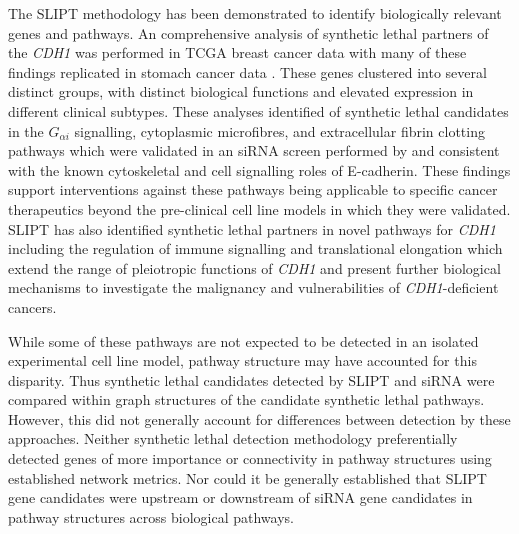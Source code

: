 The \gls{SLIPT} methodology has been demonstrated to identify biologically relevant genes and pathways. An comprehensive analysis of synthetic lethal partners of the \textit{CDH1} was performed in \gls{TCGA} breast cancer data \citep{TCGA2012} with many of these findings replicated in stomach cancer data \citep{TCGA2014GC}. These genes clustered into several distinct groups, with distinct biological functions and elevated expression in different clinical subtypes.  These analyses identified of synthetic lethal candidates in the $G_{\alpha i}$ signalling, cytoplasmic microfibres, and extracellular fibrin clotting pathways which were validated in an \gls{siRNA} screen performed by \citet{Telford2015} and consistent with the known cytoskeletal and cell signalling roles of E-cadherin. These findings support interventions against these pathways being applicable to specific cancer therapeutics beyond the pre-clinical cell line models in which they were validated. \gls{SLIPT} has also identified synthetic lethal partners in novel pathways for \textit{CDH1} including the regulation of immune signalling and translational elongation which extend the range of pleiotropic functions of \textit{CDH1} and present further biological mechanisms to investigate the malignancy and vulnerabilities of \textit{CDH1}-deficient cancers.

While some of these pathways are not expected to be detected in an isolated experimental cell line model, pathway structure may have accounted for this disparity. Thus synthetic lethal candidates detected by \gls{SLIPT} and \gls{siRNA} were compared within graph structures of the candidate synthetic lethal pathways. However, this did not generally account for differences between detection by these approaches. Neither synthetic lethal detection methodology preferentially detected genes of more importance or connectivity in pathway structures using established network metrics. Nor could it be generally established that \gls{SLIPT} gene candidates were upstream or downstream of \gls{siRNA} gene candidates in pathway structures across biological pathways.

